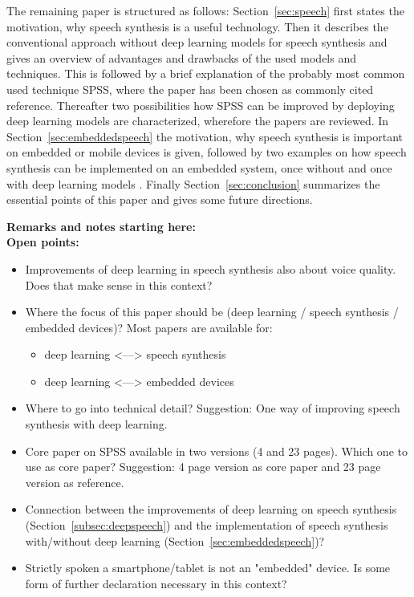 The remaining paper is structured as follows: Section~\ref{sec:speech} first states the motivation, why speech synthesis is a useful technology. Then it describes the conventional approach without deep learning models for speech synthesis and gives an overview of advantages and drawbacks of the used models and techniques. This is followed by a brief explanation of the probably most common used technique \ac{SPSS}, where the paper \cite{zen:statistical} has been chosen as commonly cited reference. Thereafter two possibilities how \ac{SPSS} can be improved by deploying deep learning models are characterized, wherefore the papers \cite{zen:deepstatistical, hashimoto:effect} are reviewed. In Section~\ref{sec:embeddedspeech} the motivation, why speech synthesis is important on embedded or mobile devices is given, followed by two examples on how speech synthesis can be implemented on an embedded system, once without \cite{toth:optimizing} and once with deep learning models \cite{boros:robust}. Finally Section~\ref{sec:conclusion} summarizes the essential points of this paper and gives some future directions.


\vfill

\textbf{\Large Remarks and notes starting here:}\\


\textbf{Open points:}

\begin{itemize}[leftmargin=10pt]
	\item Improvements of deep learning in speech synthesis also about voice quality. Does that make sense in this context?
	\item Where the focus of this paper should be (deep learning / speech synthesis / embedded devices)? Most papers are available for:
	\begin{itemize}
		\item deep learning <---> speech synthesis
		\item deep learning <---> embedded devices
	\end{itemize}
	\item Where to go into technical detail? Suggestion: One way of improving speech synthesis with deep learning.
	\item Core paper on \ac{SPSS} \cite{zen:statistical} available in two versions (4 and 23 pages). Which one to use as core paper? Suggestion: 4 page version as core paper and 23 page version as reference.
	\item Connection between the improvements of deep learning on speech synthesis (Section~\ref{subsec:deepspeech}) and the implementation of speech synthesis with/without deep learning (Section~\ref{sec:embeddedspeech})?
	\item Strictly spoken a smartphone/tablet is not an "embedded" device. Is some form of further declaration necessary in this context?
\end{itemize}

